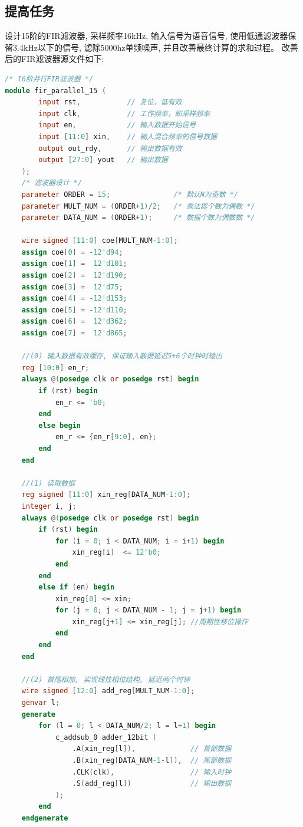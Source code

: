 \documentclass{article}
\begin{document}
\subsection*{提高任务}
设计15阶的FIR滤波器, 采样频率16kHz, 输入信号为语音信号, 使用低通滤波器保留3.4kHz以下的信号, 滤除5000hz单频噪声, 并且改善最终计算的求和过程。
改善后的FIR滤波器源文件如下:
\begin{lstlisting}[language=Verilog, caption={15阶并行FIR滤波器}]
/* 16阶并行FIR滤波器 */
module fir_parallel_15 (
        input rst,           // 复位，低有效
        input clk,           // 工作频率，即采样频率
        input en,            // 输入数据开始信号
        input [11:0] xin,    // 输入混合频率的信号数据
        output out_rdy,      // 输出数据有效
        output [27:0] yout   // 输出数据
    );
    /* 滤波器设计 */
    parameter ORDER = 15;               /* 默认N为奇数 */
    parameter MULT_NUM = (ORDER+1)/2;   /* 乘法器个数为偶数 */
    parameter DATA_NUM = (ORDER+1);     /* 数据个数为偶数数 */

    wire signed [11:0] coe[MULT_NUM-1:0];
    assign coe[0] = -12'd94;
    assign coe[1] =  12'd101;
    assign coe[2] =  12'd190;
    assign coe[3] =  12'd75;
    assign coe[4] = -12'd153;
    assign coe[5] = -12'd110;
    assign coe[6] =  12'd362;
    assign coe[7] =  12'd865;

    //(0) 输入数据有效缓存, 保证输入数据延迟5+6个时钟时输出
    reg [10:0] en_r;
    always @(posedge clk or posedge rst) begin
        if (rst) begin
            en_r <= 'b0;
        end
        else begin
            en_r <= {en_r[9:0], en};
        end
    end

    //(1) 读取数据
    reg signed [11:0] xin_reg[DATA_NUM-1:0];
    integer i, j;
    always @(posedge clk or posedge rst) begin
        if (rst) begin
            for (i = 0; i < DATA_NUM; i = i+1) begin
                xin_reg[i]  <= 12'b0;
            end
        end
        else if (en) begin
            xin_reg[0] <= xin;
            for (j = 0; j < DATA_NUM - 1; j = j+1) begin
                xin_reg[j+1] <= xin_reg[j]; //周期性移位操作
            end
        end
    end

    //(2) 首尾相加, 实现线性相位结构, 延迟两个时钟
    wire signed [12:0] add_reg[MULT_NUM-1:0];
    genvar l;
    generate
        for (l = 0; l < DATA_NUM/2; l = l+1) begin
            c_addsub_0 adder_12bit (
                .A(xin_reg[l]),             // 首部数据
                .B(xin_reg[DATA_NUM-1-l]),  // 尾部数据
                .CLK(clk),                  // 输入时钟
                .S(add_reg[l])              // 输出数据
            );
        end
    endgenerate


\end{lstlisting}
\end{document}
